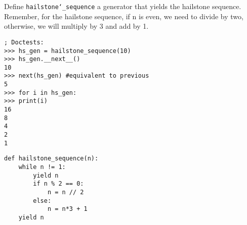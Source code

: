 \question Define \texttt{hailstone\char`_sequence} a generator that yields the
hailstone sequence. Remember, for the hailstone sequence, if n is even, we need
to divide by two, otherwise, we will multiply by 3 and add by 1.

\begin{lstlisting}
; Doctests:
>>> hs_gen = hailstone_sequence(10)
>>> hs_gen.__next__()
10
>>> next(hs_gen) #equivalent to previous
5
>>> for i in hs_gen:
>>> print(i)
16
8
4
2
1
\end{lstlisting}

\begin{solution}[1.5in]
\begin{lstlisting}
def hailstone_sequence(n):
    while n != 1:
        yield n
        if n % 2 == 0:
            n = n // 2
        else:
            n = n*3 + 1
    yield n
\end{lstlisting}
\end{solution}

